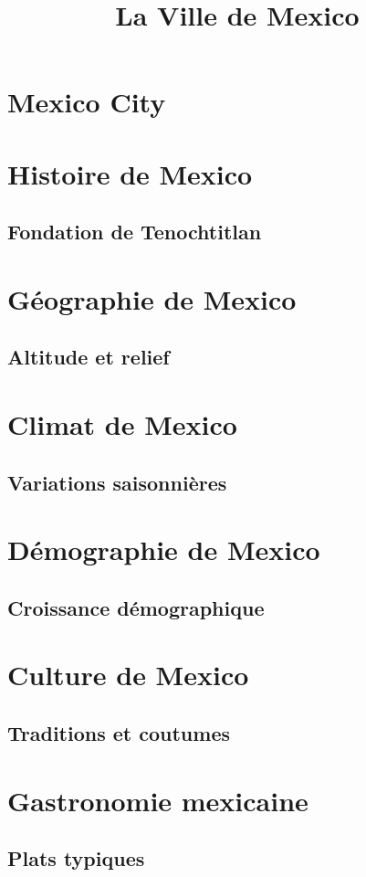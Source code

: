 \documentclass[12pt, a4paper]{article}
\title{La Ville de Mexico}
\author{}
\date{}
\begin{document}
\maketitle

\section*{Mexico City}

\section{Histoire de Mexico}
\subsection{Fondation de Tenochtitlan}
\section{Géographie de Mexico}
\subsection{Altitude et relief}
\section{Climat de Mexico}
\subsection{Variations saisonnières}
\section{Démographie de Mexico}
\subsection{Croissance démographique}
\section{Culture de Mexico}
\subsection{Traditions et coutumes}
\section{Gastronomie mexicaine}
\subsection{Plats typiques}
\end{document}
